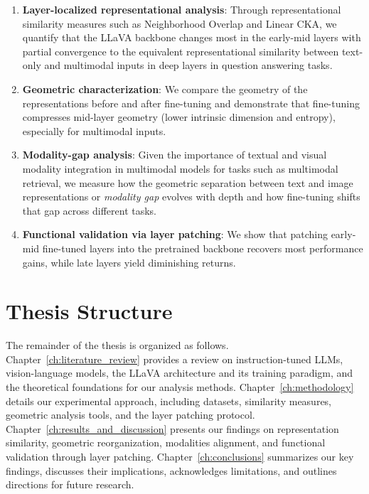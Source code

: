 \begin{enumerate}
    \item \textbf{Layer-localized representational analysis}: Through representational similarity measures such as Neighborhood Overlap and Linear CKA, we quantify that the LLaVA backbone changes most in the early-mid layers with partial convergence to the equivalent representational similarity between text-only and multimodal inputs in deep layers in question answering tasks.
    
    \item \textbf{Geometric characterization}: We compare the geometry of the representations before and after fine-tuning and demonstrate that fine-tuning compresses mid-layer geometry (lower intrinsic dimension and entropy), especially for multimodal inputs.
    
    \item \textbf{Modality-gap analysis}: Given the importance of textual and visual modality integration in multimodal models for tasks such as multimodal retrieval, we measure how the geometric separation between text and image representations or \emph{modality gap} evolves with depth and how fine-tuning shifts that gap across different tasks.
    
    \item \textbf{Functional validation via layer patching}: We show that patching early-mid fine-tuned layers into the pretrained backbone recovers most performance gains, while late layers yield diminishing returns.
\end{enumerate}

\section{Thesis Structure}

The remainder of the thesis is organized as follows. Chapter~\ref{ch:literature_review} provides a review on instruction-tuned LLMs, vision-language models, the LLaVA architecture and its training paradigm, and the theoretical foundations for our analysis methods. Chapter~\ref{ch:methodology} details our experimental approach, including datasets, similarity measures, geometric analysis tools, and the layer patching protocol. Chapter~\ref{ch:results_and_discussion} presents our findings on representation similarity, geometric reorganization, modalities alignment, and functional validation through layer patching. Chapter~\ref{ch:conclusions} summarizes our key findings, discusses their implications, acknowledges limitations, and outlines directions for future research.
